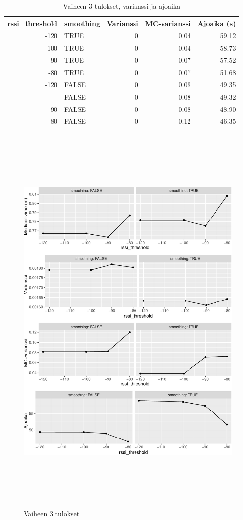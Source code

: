 \documentclass[
  12pt,
  a4paper, twoside]{book}
\begin{document}
\begin{table}

\caption{\label{tab:vaihe-3-tulokset-varianssi}Vaiheen 3 tulokset, varianssi ja ajoaika}
\centering
\begin{tabular}[t]{rlrrr}
\toprule
rssi\_threshold & smoothing & Varianssi & MC-varianssi & Ajoaika (s)\\
\midrule
-120 & TRUE & 0 & 0.04 & 59.12\\
-100 & TRUE & 0 & 0.04 & 58.73\\
-90 & TRUE & 0 & 0.07 & 57.52\\
-80 & TRUE & 0 & 0.07 & 51.68\\
-120 & FALSE & 0 & 0.08 & 49.35\\
\addlinespace
-100 & FALSE & 0 & 0.08 & 49.32\\
-90 & FALSE & 0 & 0.08 & 48.90\\
-80 & FALSE & 0 & 0.12 & 46.35\\
\bottomrule
\end{tabular}
\end{table}

\clearpage

\begin{figure}

{\centering \includegraphics[width=15cm,height=20cm]{output/figures/phase3-results-1} 

}

\caption{Vaiheen 3 tulokset}\label{fig:phase3-results}
\end{figure}
\end{document}
